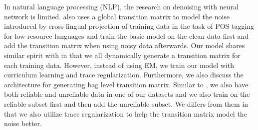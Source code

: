 In natural language processing (NLP), the research on denoising with neural network is limited. \cite{fang2016learning} also uses a global transition matrix to model the noise introduced by cross-lingual projection of training data in the task of POS tagging for low-resource languages and train the basic model on the clean data first and add the transition matrix when using noisy data afterwards. Our model shares similar spirit with \cite{misra2016seeing} in that we all dynamically generate a transition matrix for each training data. However, instead of using EM, we train our model with curriculum learning and trace regularization. Furthermore, we also discuss the architecture for generating bag level transition matrix. Similar to \cite{fang2016learning}, we also have both reliable and unreliable data in one of our datasets and we also train on the reliable subset first and then add the unreliable subset. We differs from them in that we also utilize trace regularization to help the transition matrix model the noise better.


